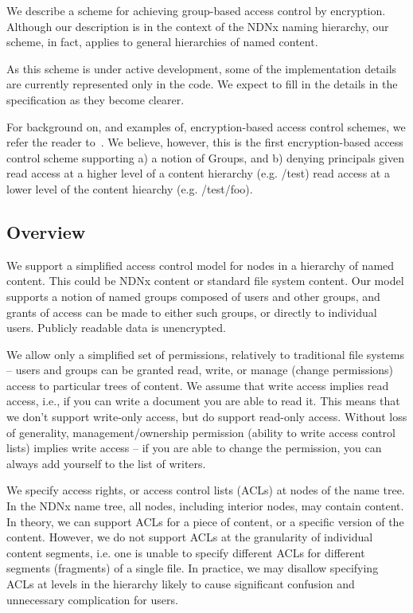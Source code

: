 We describe a scheme for achieving group-based access control by
encryption. Although our description is in the context of the NDNx
naming hierarchy, our scheme, in fact, applies to general hierarchies
of named content.

As this scheme is under active development, some of the implementation
details are currently represented only in the code. We expect to fill
in the details in the specification as they become clearer.

For background on, and examples of, encryption-based access control
schemes, we refer the reader to~\cite{At2005,cryptree}. We believe, however,
this is the first encryption-based access control scheme supporting a)
a notion of Groups, and b) denying principals given read access at
a higher level of a content hierarchy (e.g. /test) read access at a
lower level of the content hiearchy (e.g. /test/foo).

\subsection{Overview}

We support a simplified access control model for nodes in a hierarchy
of named content. This could be NDNx content or standard file system
content. Our model supports a notion of named groups composed of users
and other groups, and grants of access can be made to either such
groups, or directly to individual users. Publicly readable data is
unencrypted.

We allow only a simplified set of permissions, relatively to
traditional file systems -- users and groups can be granted read,
write, or manage (change permissions) access to particular trees of
content. We assume that write access implies read access, i.e., if you
can write a document you are able to read it. This means that we don't
support write-only access, but do support read-only access. Without
loss of generality, management/ownership permission (ability to write
access control lists) implies write access -- if you are able to
change the permission, you can always add yourself to the list of
writers.

We specify access rights, or access control lists (ACLs) at nodes of
the name tree. In the NDNx name tree, all nodes, including interior
nodes, may contain content. In theory, we can support ACLs for a piece
of content, or a specific version of the content. However, we do not
support ACLs at the granularity of individual content segments,
i.e. one is unable to specify different ACLs for different segments
(fragments) of a single file. In practice, we may disallow specifying
ACLs at levels in the hierarchy likely to cause significant confusion
and unnecessary complication for users.

